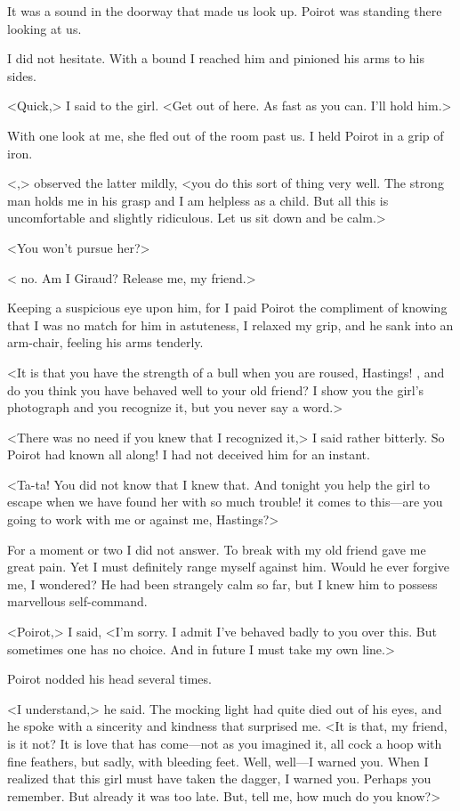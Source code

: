  It was a sound in the doorway that made us look up. Poirot was standing there looking at us. 

 I did not hesitate. With a bound I reached him and pinioned his arms to his sides. 

 <Quick,> I said to the girl. <Get out of here. As fast as you can. I'll hold him.> 

 With one look at me, she fled out of the room past us. I held Poirot in a grip of iron. 

 <,> observed the latter mildly, <you do this sort of thing very well. The strong man holds me in his grasp and I am helpless as a child. But all this is uncomfortable and slightly ridiculous. Let us sit down and be calm.> 

 <You won't pursue her?> 

 < no. Am I Giraud? Release me, my friend.> 

 Keeping a suspicious eye upon him, for I paid Poirot the compliment of knowing that I was no match for him in astuteness, I relaxed my grip, and he sank into an arm-chair, feeling his arms tenderly. 

 <It is that you have the strength of a bull when you are roused, Hastings! , and do you think you have behaved well to your old friend? I show you the girl's photograph and you recognize it, but you never say a word.> 

 <There was no need if you knew that I recognized it,> I said rather bitterly. So Poirot had known all along! I had not deceived him for an instant. 

 <Ta-ta! You did not know that I knew that. And tonight you help the girl to escape when we have found her with so much trouble!  it comes to this—are you going to work with me or against me, Hastings?> 

 For a moment or two I did not answer. To break with my old friend gave me great pain. Yet I must definitely range myself against him. Would he ever forgive me, I wondered? He had been strangely calm so far, but I knew him to possess marvellous self-command. 

 <Poirot,> I said, <I'm sorry. I admit I've behaved badly to you over this. But sometimes one has no choice. And in future I must take my own line.> 

 Poirot nodded his head several times. 

 <I understand,> he said. The mocking light had quite died out of his eyes, and he spoke with a sincerity and kindness that surprised me. <It is that, my friend, is it not? It is love that has come—not as you imagined it, all cock a hoop with fine feathers, but sadly, with bleeding feet. Well, well—I warned you. When I realized that this girl must have taken the dagger, I warned you. Perhaps you remember. But already it was too late. But, tell me, how much do you know?> 

